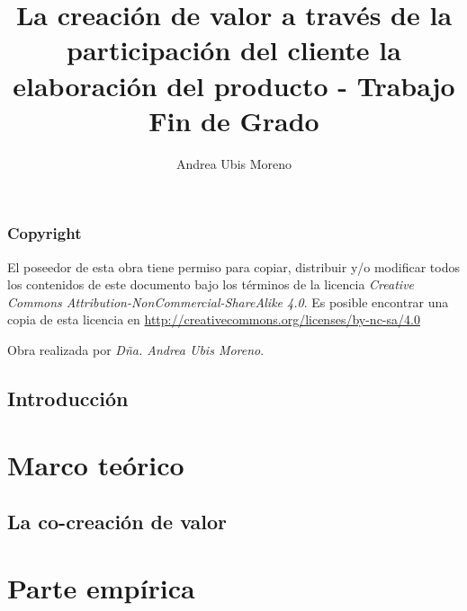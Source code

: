 \documentclass[a4paper,11pt]{scrbook} %
\title{La creación de valor a través de la participación del cliente la elaboración del producto - Trabajo Fin de Grado}
\author{Andrea Ubis Moreno}
\begin{document}



\section*{Copyright}
El poseedor de esta obra tiene permiso para copiar, distribuir y/o modificar todos los contenidos de este documento bajo los términos de la licencia \emph{Creative Commons Attribution-NonCommercial-ShareAlike 4.0}. Es posible encontrar una copia de esta licencia en \url{http://creativecommons.org/licenses/by-nc-sa/4.0}

Obra realizada por \emph{Dña. Andrea Ubis Moreno}.



\frontmatter                                              %





\tableofcontents

\listoffigures
\listoftables

\chapter{Introducción}




\mainmatter                                               %

\part{Marco teórico}

\chapter{La co-creación de valor}
\label{section:cocreacion}


\part{Parte empírica}
\end{document}
